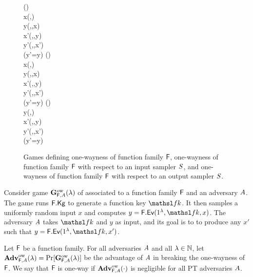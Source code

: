 
\begin{figure}[t]
{
\vspace{-1.0em} %
  {
    \FKey\getsr\Kg{\FF}(\secIn)\\
    x\getsr\Dom{\FF}(\secParam,\FKey)\\
    y\gets\Ev{\FF}(\secIn,\FKey,x)\\
    x'\getsr\advA(\secIn,\FKey,y)\\
	y'\gets\Ev{\FF}(\secIn,\FKey,x')\\
    \pcreturn (y'=y)
  }
}
{
\vspace{-1.0em} %
  {
    \FKey\getsr\Kg{\FF}(\secIn)\\
    x\getsr\sampS(\secIn,\FKey)\\
    y\gets\Ev{\FF}(\secIn,\FKey,x)\\
    x'\getsr\advA(\secIn,\FKey,y)\\
	y'\gets\Ev{\FF}(\secIn,\FKey,x')\\
    \pcreturn (y'=y)
  }
}
{
\vspace{-1.0em} %
  {
    \FKey\getsr\Kg{\FF}(\secIn)\\
    y\getsr\sampS(\secIn,\FKey)\\
    x'\getsr\advA(\secIn,\FKey,y)\\
	y'\gets\Ev{\FF}(\secIn,\FKey,x')\\
    \pcreturn (y'=y)
  }
}
\figvspace
\caption{Games defining
           one-wayness of function family $\mathsf{F}$,
		   one-wayness of function family $\mathsf{F}$ with respect to an input sampler $S$,
		   and one-wayness of function family $\mathsf{F}$ with respect to an output sampler $S$.}
\label{fig-sample-game}
\label{fig-ff-ow}
\label{fig-ff-isow}
\label{fig-ff-osow}
\hrulefill
\end{figure}

Consider game $\mathbf{G}^{\rm ow}_{\mathsf{F},A}(\lambda)$ of  associated to a function family $\mathsf{F}$ and an adversary $A$.
The game runs $\mathsf{F}.\mathsf{Kg}$ to generate a function key $\FKey$.
It then samples a uniformly random input $x$ and computes $y = \Ev{\FF}(\secIn,\FKey,x)$.
The adversary $A$ takes $\FKey$ and $y$ as input, and its goal is to to produce any $x'$ such that $y = \Ev{\FF}(\secIn,\FKey,x')$.
\begin{defn}
  Let $\mathsf{F}$ be a function family.
  For all adversaries $A$ and all $\lambda\in{{\mathbb N}}$, let $\mathbf{Adv}^{\rm ow}_{\mathsf{F},A}(\lambda)=\Pr[\mathbf{G}^{\rm ow}_{\mathsf{F},A}(\lambda)]$ be the advantage of $A$ in breaking the one-wayness of $\mathsf{F}$.
  We say that $\mathsf{F}$ is one-way if $\mathbf{Adv}^{\rm ow}_{\mathsf{F},A}(\cdot)$ is negligible for all PT adversaries $A$.
\end{defn}

